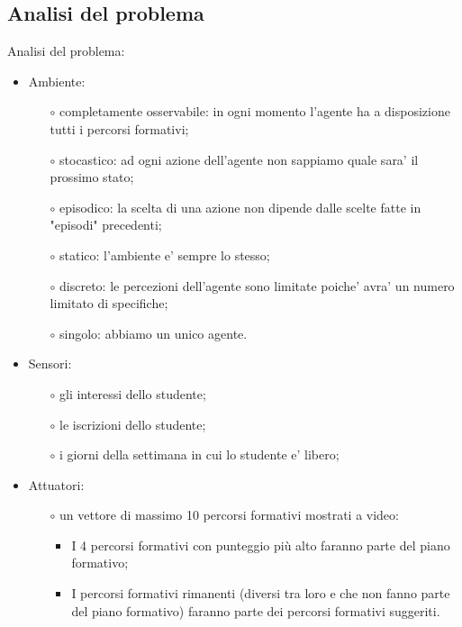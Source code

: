 \documentclass[10pt,a4paper]{article}
\begin{document}
    \subsection{Analisi del problema}
      \label{analisiDelProblemaSubsection}
      Analisi del problema:\\
      \begin{itemize}
        \item Ambiente:
        \begin{itemize}
          \item[$\circ$] completamente osservabile: in ogni momento l'agente ha a disposizione tutti i percorsi formativi;
          \item[$\circ$] stocastico: ad ogni azione dell'agente non sappiamo quale sara' il prossimo stato;
          \item[$\circ$] episodico: la scelta di una azione non dipende dalle scelte fatte in "episodi" precedenti;
          \item[$\circ$] statico: l'ambiente e' sempre lo stesso;
          \item[$\circ$] discreto: le percezioni dell'agente sono limitate poiche' avra' un numero limitato di specifiche;
          \item[$\circ$] singolo: abbiamo un unico agente.
        \end{itemize}
        
        \item Sensori:
        \begin{itemize}
          \item[$\circ$] gli interessi dello studente;
          \item[$\circ$] le iscrizioni dello studente;
          \item[$\circ$] i giorni della settimana in cui lo studente e' libero;
        \end{itemize}
        
        \item Attuatori:
        \begin{itemize}
          \item[$\circ$] un vettore di massimo 10 percorsi formativi mostrati a video:
          \begin{itemize}
            \item I 4 percorsi formativi con punteggio più alto faranno parte del piano formativo;
            \item I percorsi formativi rimanenti (diversi tra loro e che non fanno parte 
            del piano formativo) faranno parte dei percorsi formativi suggeriti. 
          \end{itemize}
        \end{itemize}
      \end{itemize}%
        
\end{document}
